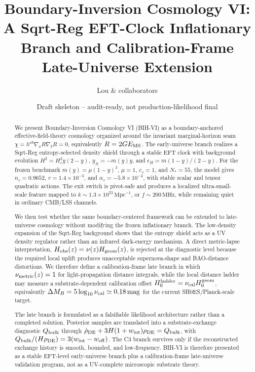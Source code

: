 \documentclass[11pt]{article}
\title{Boundary-Inversion Cosmology VI:\\
A Sqrt-Reg EFT-Clock Inflationary Branch and Calibration-Frame Late-Universe Extension}
\author{Lou \& collaborators}
\date{Draft skeleton -- audit-ready, not production-likelihood final}
\begin{document}
\maketitle

\begin{abstract}
We present Boundary-Inversion Cosmology VI (BIH-VI) as a boundary-anchored effective-field-theory cosmology organized around the invariant marginal-horizon seam $\chi=h^{ab}\nabla_a R\nabla_b R=0$, equivalently $R=2G E_{\rm MS}$. The early-universe branch realizes a Sqrt-Reg entropy-selected density shield through a stable EFT clock with background evolution $H^2=H_c^2y(2-y)$, $y_N=-m(y)y$, and $\epsilon_H=m(1-y)/(2-y)$. For the frozen benchmark $m(y)=\mu(1-y)^3$, $\mu=1$, $c_s=1$, and $N_*=55$, the model gives $n_s=0.9652$, $r=1.4\times10^{-3}$, and $\alpha_s=-5.8\times10^{-4}$, with stable scalar and tensor quadratic actions. The exit switch is pivot-safe and produces a localized ultra-small-scale feature mapped to $k\sim1.3\times10^{23}\,\mathrm{Mpc}^{-1}$, or $f\sim200\,\mathrm{MHz}$, while remaining quiet in ordinary CMB/LSS channels.

We then test whether the same boundary-centered framework can be extended to late-universe cosmology without modifying the frozen inflationary branch. The low-density expansion of the Sqrt-Reg background shows that the entropy shield acts as a UV density regulator rather than an infrared dark-energy mechanism. A direct metric-lapse interpretation, $H_{\rm obs}(z)=\nu(z)H_{\rm geom}(z)$, is rejected at the diagnostic level because the required local uplift produces unacceptable supernova-shape and BAO-distance distortions. We therefore define a calibration-frame late branch in which $\nu_{\rm metric}(z)=1$ for light-propagation distance integrals, while the local distance ladder may measure a substrate-dependent calibration offset $H_0^{\rm ladder}=\nu_{\rm cal}H_0^{\rm geom}$, equivalently $\Delta M_B=5\log_{10}\nu_{\rm cal}\simeq0.18\,\mathrm{mag}$ for the current SH0ES/Planck-scale target.

The late branch is formulated as a falsifiable likelihood architecture rather than a completed solution. Posterior samples are translated into a substrate-exchange diagnostic $Q_{\rm bulk}$ through $\dot\rho_{\rm DE}+3H(1+w_{\rm int})\rho_{\rm DE}=Q_{\rm bulk}$, with $Q_{\rm bulk}/(H\rho_{\rm DE})=3(w_{\rm int}-w_{\rm eff})$. The C3 branch survives only if the reconstructed exchange history is smooth, bounded, and low-frequency. BIH-VI is therefore presented as a stable EFT-level early-universe branch plus a calibration-frame late-universe validation program, not as a UV-complete microscopic substrate theory.
\end{abstract}
\end{document}
